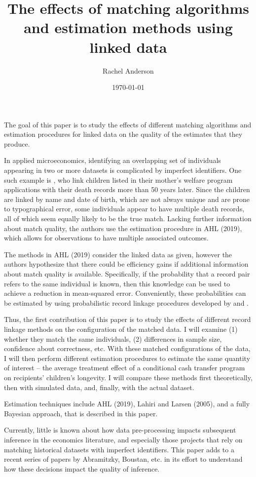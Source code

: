 \documentclass[12pt]{article}
\title{The effects of matching algorithms and estimation methods using linked data}
\author{Rachel Anderson}
\date{\today}
\begin{document}
\maketitle

The goal of this paper is to study the effects of different matching algorithms and estimation procedures for linked data on the quality of the estimates that they produce.  

In applied microeconomics, identifying an overlapping set of individuals appearing in two or more datasets is complicated by imperfect identifiers. One such example is \cite{CITE HERE}, who link children listed in their mother's welfare program applications with their death records more than 50 years later.  Since the children are linked by name and date of birth, which are not always unique and are prone to typographical error, some individuals appear to have multiple death records, all of which seem equally likely to be the true match.   Lacking further information about match quality, the authors use the estimation procedure in AHL (2019), which allows for observations to have multiple associated outcomes.  

The methods in AHL (2019) consider the linked data as given, however the authors hypothesize that there could be efficiency gains if additional information about match quality is available.  Specifically, if the probability that a record pair refers to the same individual is known, then this knowledge can be used to achieve a reduction in mean-squared error.  Conveniently, these probabilities can be estimated by using probabilistic record linkage procedures developed by \cite{} and \cite{}. 

Thus, the first contribution of this paper is to study the effects of different record linkage methods on the configuration of the matched data.  I will examine (1) whether they match the same individuals, (2) differences in sample size, confidence about correctness, etc.  With these matched configurations of the data, I will then perform different estimation procedures to estimate the same quantity of interest -- the average treatment effect of a conditional cash transfer program on recipients' children's longevity.   I will compare these methods first theoretically, then with simulated data, and, finally, with the actual dataset.   

Estimation techniques include AHL (2019), Lahiri and Larsen (2005), and a fully Bayesian approach, that is described in this paper. 

Currently, little is known about how data pre-processing impacts subsequent inference in the economics literature, and especially those projects that rely on matching historical datasets with imperfect identifiers.  This paper adds to a recent series of papers by Abramitzky, Boustan, etc.  in its effort to understand how these decisions impact the quality of inference. 
\end{document}
